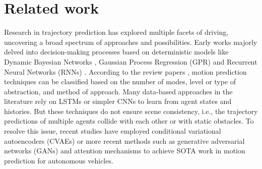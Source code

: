\documentclass{article}
\begin{document}
\section{Related work}\vspace{-10pt}
Research in trajectory prediction has explored multiple facets of driving, uncovering a broad spectrum of approaches and possibilities.  Early works majorly delved into decision-making processes based on deterministic models like Dynamic Bayesian Networks \cite{Lefvre2014ASO}, Gaussian
 Process Regression (GPR) \cite{4359316} and Recurrent Neural Networks (RNNs) \cite{article} \cite{8460504} \cite{jia2022towards} . According to the review papers \cite{Leon_2021} \cite{Rudenko_2020}, motion prediction techniques can be classified based on the number of modes, level or type of abstraction, and method of approach. 
Many data-based approaches in the literature rely on LSTMs
or simpler CNNs
\cite{nikhil2018convolutional} to learn from agent states and histories. But these techniques do not ensure scene consistency, i.e., the trajectory predictions of multiple agents collide with each other or with static obstacles. 
To resolve this issue, recent studies have employed conditional variational autoencoders (CVAEs) or more recent methods
such as generative adversarial networks (GANs) and attention mechanisms to achieve SOTA work in motion prediction for autonomous vehicles. 

\end{document}
